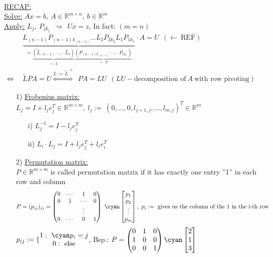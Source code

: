 \begin{frame}
	~\\
	{\blank
		\underline{RECAP:}\\
		\underline{Solve:} $Ax=b,~A\in\mathbb{R}^{m\times n},~b\in\mathbb{R}^m$\\
		\underline{Apply:} $L_j,~P_{jk_j}~~\rightsquigarrow~~Ux=z$,
		In fact: $(m=n)$
		\begin{align*}
		&\underbrace{
			L_{(n-1)}P_{(n-1)k_{(n-1)}}\dots L_2P_{2k_2}L_1P_{1k_1}}_{=\underbrace{
				(\hat{L}_{(n-1)}\cdot\dots\cdot\hat{L}_1)}_{=:\tilde{L}}\underbrace{
				(P_{(n-1)k_{(n-1)}}\cdot\dots\cdot P_{1k_1})}_{=:P}}\cdot A=U~~(\leftarrow~\text{REF})\\
		\Leftrightarrow~~&\tilde{L}PA=U
		\stackrel{L:=\tilde{L}^{-1}}{\Leftrightarrow}~~PA = LU~~(LU-\text{decomposition of}~A~\text{with row pivoting})
		\end{align*}
		\begin{itemize}\blank
			\item [1)]
			\underline{Frobenius matrix:}
			$L_j = I+l_je_j^T\in\mathbb{R}^{m\times m},~l_j:=~(0,\dots,0,l_{j+1,j},\dots,l_{m,j})^T\in\mathbb{R}^m$
			\begin{itemize}
				\item [i)]
				$L_j^{-1}=I-l_je_j^T$
				\item [ii)]
				$L_i\cdot L_j = I+l_je_j^T+l_ie_i^T$
			\end{itemize}
			\item [2)]
			\underline{Permutation matrix:}\\
			$P\in\mathbb{R}^{m\times m}$ is called permutation matrix if it has exactly one entry ''1'' in each row and column
			$$
			P=(p_{ij})_{ij}=\begin{pmatrix}
			0&\cdots&1&0\\
			0&1&\cdots&0\\
			~&~&\vdots&~\\
			0&\cdots&0&1
			\end{pmatrix}~
			{\cyan \begin{bmatrix}
				p_1\\p_2\\\vdots\\p_m
				\end{bmatrix},~p_i:=~\text{gives us the column of the 1 in the i-th row}}
			$$
			$p_{ij}:=\lbrace\begin{matrix}
			1:~{\cyan p_i=j}\\
			0:~\text{else}
			\end{matrix}$, Bsp.: $P = \begin{pmatrix}
			0&1&0\\1&0&0\\0&0&1
			\end{pmatrix}{\cyan \begin{bmatrix}
				2\\1\\3
				\end{bmatrix}}$
		\end{itemize}
	}
\end{frame}
